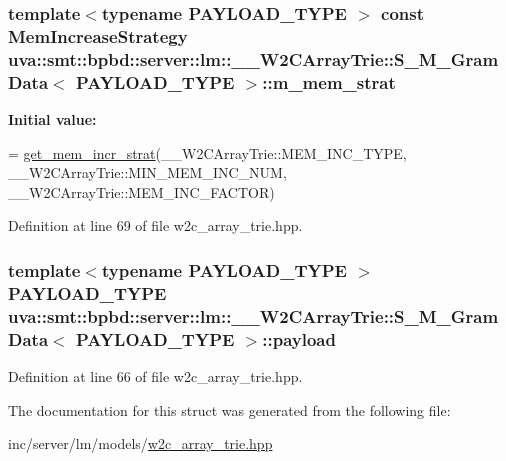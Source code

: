\subsubsection[{m\+\_\+mem\+\_\+strat}]{\setlength{\rightskip}{0pt plus 5cm}template$<$typename P\+A\+Y\+L\+O\+A\+D\+\_\+\+T\+Y\+P\+E $>$ const {\bf Mem\+Increase\+Strategy} {\bf uva\+::smt\+::bpbd\+::server\+::lm\+::\+\_\+\+\_\+\+W2\+C\+Array\+Trie\+::\+S\+\_\+\+M\+\_\+\+Gram\+Data}$<$ P\+A\+Y\+L\+O\+A\+D\+\_\+\+T\+Y\+P\+E $>$\+::m\+\_\+mem\+\_\+strat\hspace{0.3cm}{\ttfamily [static]}}\label{structuva_1_1smt_1_1bpbd_1_1server_1_1lm_1_1_____w2_c_array_trie_1_1_s___m___gram_data_a765a646b8bca568bf1012b044d812ff7}
{\bfseries Initial value\+:}
\begin{DoxyCode}
=
                        \hyperlink{namespaceuva_1_1utils_1_1containers_af28472cb52d5ebfb2006a085f3da586e}{get\_mem\_incr\_strat}(\_\_W2CArrayTrie::MEM\_INC\_TYPE,
                                \_\_W2CArrayTrie::MIN\_MEM\_INC\_NUM, \_\_W2CArrayTrie::MEM\_INC\_FACTOR)
\end{DoxyCode}


Definition at line 69 of file w2c\+\_\+array\+\_\+trie.\+hpp.

\hypertarget{structuva_1_1smt_1_1bpbd_1_1server_1_1lm_1_1_____w2_c_array_trie_1_1_s___m___gram_data_a623cb2bdb3aea0d0d9a88110271fe89b}{}
\subsubsection[{payload}]{\setlength{\rightskip}{0pt plus 5cm}template$<$typename P\+A\+Y\+L\+O\+A\+D\+\_\+\+T\+Y\+P\+E $>$ P\+A\+Y\+L\+O\+A\+D\+\_\+\+T\+Y\+P\+E {\bf uva\+::smt\+::bpbd\+::server\+::lm\+::\+\_\+\+\_\+\+W2\+C\+Array\+Trie\+::\+S\+\_\+\+M\+\_\+\+Gram\+Data}$<$ P\+A\+Y\+L\+O\+A\+D\+\_\+\+T\+Y\+P\+E $>$\+::payload}\label{structuva_1_1smt_1_1bpbd_1_1server_1_1lm_1_1_____w2_c_array_trie_1_1_s___m___gram_data_a623cb2bdb3aea0d0d9a88110271fe89b}


Definition at line 66 of file w2c\+\_\+array\+\_\+trie.\+hpp.



The documentation for this struct was generated from the following file\+:\begin{DoxyCompactItemize}
\item 
inc/server/lm/models/\hyperlink{w2c__array__trie_8hpp}{w2c\+\_\+array\+\_\+trie.\+hpp}\end{DoxyCompactItemize}
